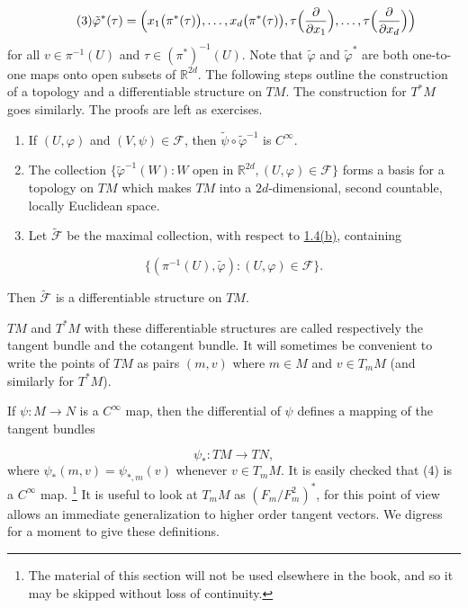 \begin{equation}
	\tag{3}\label{eq:1.25:3}
	\tilde{\varphi}^{*}(\tau)=\Bigl(x_{1}\bigl(\pi^{*}(\tau)\bigr),\ldots,x_{d}\bigl(\pi^{*}(\tau)\bigr),\tau\Bigl(\frac{\partial}{\partial x_{1}}\Bigr),\ldots,\tau\Bigl(\frac{\partial}{\partial x_{d}}\Bigr)\Bigr)
\end{equation}
for all $v\in\pi^{-1}(U)$ and $\tau\in(\pi^{*})^{-1}(U)$. Note that $\widetilde{\varphi}$ and $\widetilde{\varphi}^*$ are both one-to-one maps onto open subsets of $\mathbb{R}^{2d}$. The following steps outline the construction of a topology and a differentiable structure on $TM$. The construction for $T^{*}M$ goes similarly. The proofs are left as exercises.
\begin{enumerate}
	\item[(a)] If $(U,\varphi)$ and $(V,\psi)\in\mathcal{F}$, then $\tilde{\psi}\circ\tilde{\varphi}^{-1}$ is  $ C^{\infty} $.

	\item[(b)] The collection $\{\tilde{\varphi}^{-1}(W)\colon W \text{ open in } \mathbb{R}^{2d}, (U,\varphi) \in \mathcal{F}\}$ forms a basis for a topology on $TM$ which makes $TM$ into a $2d$-dimensional, second countable, locally Euclidean space.

	\item[(c)] Let $\widetilde{\mathcal{F}}$ be the maximal collection, with respect to \hyperref[thm:1.4]{1.4(b)}, containing
\end{enumerate}
\[
	\{(\pi^{-1}(U),\widetilde{\varphi})\colon(U,\varphi)\in\mathcal{F}\}.
\]

Then $\widetilde{\mathcal{F}}$ is a differentiable structure on $TM$.

$TM$ and $T^{*}M$ with these differentiable structures are called respectively the tangent bundle and the cotangent bundle. It will sometimes be convenient to write the points of $TM$ as pairs $(m,v)$ where $m\in M$ and $v\in T_{m} M$ (and similarly for $T^{*}M$).

If $\psi: M \to N$ is a $C^{\infty}$ map, then the differential of $\psi$ defines a mapping of the tangent bundles

\begin{equation}
	\tag{4}\label{eq:1.25:4}
	\psi_{*}\colon TM\to TN,
\end{equation}
where  $ \psi_{*}(m,v) = \psi_{*,m}(v) $ whenever  $ v \in T_{m} M $. It is easily checked that (4) is a  $ C^{\infty} $ map.
\label{thm:1.26}\footnote{The material of this section will not be used elsewhere in the book, and so it may be skipped without loss of continuity.}
It is useful to look at $T_{m} M$ as $(F_{m}/F_{m}^{2})^{*}$, for this point of view allows an immediate generalization to higher order tangent vectors. We digress for a moment to give these definitions.

